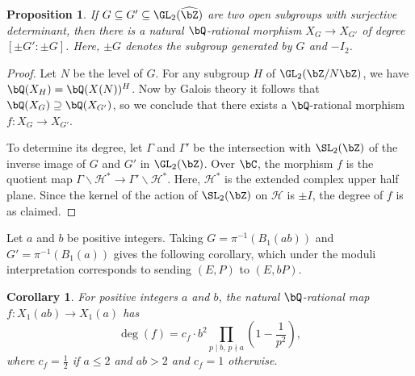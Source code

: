 \documentclass[11pt,reqno]{amsart}
\theoremstyle{plain}
\newtheorem{proposition}[theorem]{Proposition}
\newtheorem{corollary}[theorem]{Corollary}
\theoremstyle{definition}
\newcommand{\Q}{\bQ}
\newcommand{\Z}{\bZ}
\begin{document}
\begin{proposition} \label{prop:mapdegree}
If $G \subseteq G' \subseteq \GL_2(\widehat{\Z})$ are two open subgroups with surjective determinant, then there is a natural $\Q$-rational morphism $X_G \rightarrow X_{G'}$ of degree $[\pm G': \pm G]$. Here, $\pm G$ denotes the subgroup generated by $G$ and $-I_2$.
\end{proposition}
\begin{proof}
Let $N$ be the level of $G$. For any subgroup $H$ of $\GL_2(\Z/N\Z)$, we have $\Q(X_H)=\Q(X(N))^H$. Now by Galois theory it follows that $\Q(X_G) \supseteq \Q(X_{G'})$, so we conclude that there exists a $\Q$-rational morphism $f\colon X_G \rightarrow X_{G'}$.

To determine its degree, let $\Gamma$ and $\Gamma'$ be the intersection with $\SL_2(\Z)$ of the inverse image of $G$ and $G'$ in $\GL_2(\Z)$. Over $\bC$, the morphism $f$ is the quotient map $\Gamma \backslash \mathcal{H}^* \rightarrow \Gamma' \backslash \mathcal{H}^*$. Here, $\mathcal{H}^*$ is the extended complex upper half plane. Since the kernel of the action of $\SL_2(\Z)$ on $\mathcal H$ is $\pm I$, the degree of $f$ is as claimed.
\end{proof}

Let $a$ and $b$ be positive integers. Taking $G=\pi^{-1}(B_1(ab))$ and $G'=\pi^{-1}(B_1(a))$ gives the following corollary, which under the moduli interpretation corresponds to sending $(E,P)$ to $(E,bP)$.  

\begin{corollary}\label{Cor:DegreeFormula}
                For positive integers $a$ and $b$, the natural $\Q$-rational map $f\colon X_1(ab) \rightarrow X_1(a)$ has
                \[
                    \deg(f)=
                    c_{f}\cdot b^2 \prod_{p \mid b,\, p \nmid a}
                    \left(1-\frac{1}{p^2}\right),
                \]
                where $c_{f}=\frac{1}{2}$ if $a \leq 2$ and $ab>2$ and $c_{f}=1$ otherwise.
\end{corollary}
\end{document}
